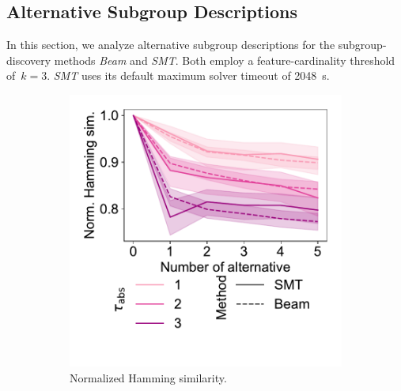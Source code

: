 \documentclass{article}
\theoremstyle{definition}
\begin{document}
\subsection{Alternative Subgroup Descriptions}
\label{sec:csd:evaluation:alternatives}

In this section, we analyze alternative subgroup descriptions for the subgroup-discovery methods \emph{Beam} and \emph{SMT}.
Both employ a feature-cardinality threshold of~$k=3$.
\emph{SMT} uses its default maximum solver timeout of 2048~s.

\begin{figure}[t]
	\centering
	\begin{subfigure}[t]{0.48\textwidth}
		\centering
		\includegraphics[width=\textwidth, trim=15 50 15 15, clip]{plots/csd-alternatives-hamming.pdf}
		\caption{Normalized Hamming similarity.}
		\label{fig:csd:alternatives-hamming}
	\end{subfigure}
	\hfill
	\begin{subfigure}[t]{0.48\textwidth}
		\centering

\end{subfigure}
\end{figure}
\end{document}
